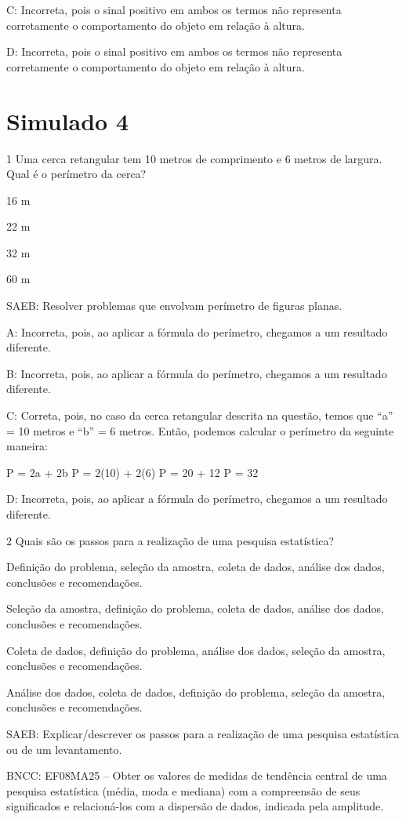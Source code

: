 {C: Incorreta, pois o sinal positivo em ambos os termos não representa
corretamente o comportamento do objeto em relação à altura.

D: Incorreta, pois o sinal positivo em ambos os termos não representa
corretamente o comportamento do objeto em relação à altura.


\section{Simulado 4}

\num{1} Uma cerca retangular tem 10 metros de comprimento e 6 metros de
largura. Qual é o perímetro da cerca?
\item 16 m
\item 22 m
\item 32 m
\item 60 m

SAEB: Resolver problemas que envolvam perímetro de figuras planas.

A: Incorreta, pois, ao aplicar a fórmula do perímetro, chegamos a um
resultado diferente.

B: Incorreta, pois, ao aplicar a fórmula do perímetro, chegamos a um
resultado diferente.

C: Correta, pois, no caso da cerca retangular descrita na questão, temos
que ``a'' = 10 metros e ``b'' = 6 metros. Então, podemos calcular o
perímetro da seguinte maneira:

P = 2a + 2b P = 2(10) + 2(6) P = 20 + 12 P = 32

D: Incorreta, pois, ao aplicar a fórmula do perímetro, chegamos a um
resultado diferente.

\num{2} Quais são os passos para a realização de uma pesquisa estatística?
\item Definição do problema, seleção da amostra, coleta de dados, análise
dos dados, conclusões e recomendações.
\item Seleção da amostra, definição do problema, coleta de dados, análise
dos dados, conclusões e recomendações.
\item Coleta de dados, definição do problema, análise dos dados, seleção da
amostra, conclusões e recomendações.
\item Análise dos dados, coleta de dados, definição do problema, seleção da
amostra, conclusões e recomendações.

SAEB: Explicar/descrever os passos para a realização de uma pesquisa
estatística ou de um levantamento.

BNCC: EF08MA25 -- Obter os valores de medidas de tendência central de
uma pesquisa estatística (média, moda e mediana) com a compreensão de
seus significados e relacioná-los com a dispersão de dados, indicada
pela amplitude.

}
